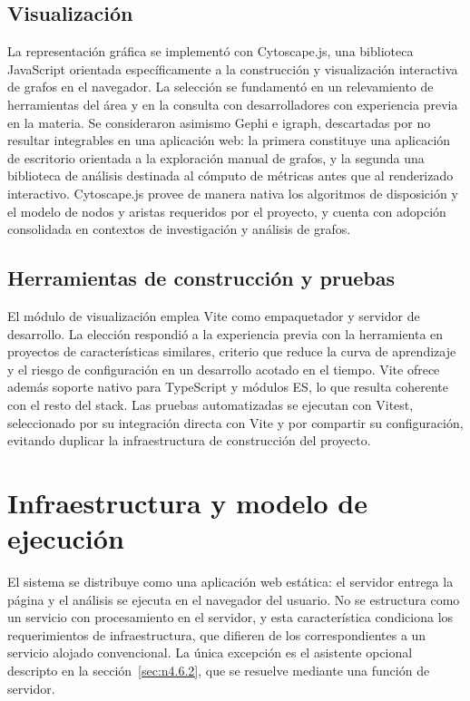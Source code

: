 \subsection{Visualización}\label{sec:n4.3.3}

La representación gráfica se implementó con Cytoscape.js, una biblioteca JavaScript orientada específicamente a la construcción y visualización interactiva de grafos en el navegador. La selección se fundamentó en un relevamiento de herramientas del área y en la consulta con desarrolladores con experiencia previa en la materia. Se consideraron asimismo Gephi e igraph, descartadas por no resultar integrables en una aplicación web: la primera constituye una aplicación de escritorio orientada a la exploración manual de grafos, y la segunda una biblioteca de análisis destinada al cómputo de métricas antes que al renderizado interactivo. Cytoscape.js provee de manera nativa los algoritmos de disposición y el modelo de nodos y aristas requeridos por el proyecto, y cuenta con adopción consolidada en contextos de investigación y análisis de grafos.

\subsection{Herramientas de construcción y pruebas}\label{sec:n4.3.4}

El módulo de visualización emplea Vite como empaquetador y servidor de desarrollo. La elección respondió a la experiencia previa con la herramienta en proyectos de características similares, criterio que reduce la curva de aprendizaje y el riesgo de configuración en un desarrollo acotado en el tiempo. Vite ofrece además soporte nativo para TypeScript y módulos ES, lo que resulta coherente con el resto del stack. Las pruebas automatizadas se ejecutan con Vitest, seleccionado por su integración directa con Vite y por compartir su configuración, evitando duplicar la infraestructura de construcción del proyecto.

\section{Infraestructura y modelo de ejecución}\label{sec:n4.4}

El sistema se distribuye como una aplicación web estática: el servidor entrega la página y el análisis se ejecuta en el navegador del usuario. No se estructura como un servicio con procesamiento en el servidor, y esta característica condiciona los requerimientos de infraestructura, que difieren de los correspondientes a un servicio alojado convencional. La única excepción es el asistente opcional descripto en la sección~\ref{sec:n4.6.2}, que se resuelve mediante una función de servidor.

